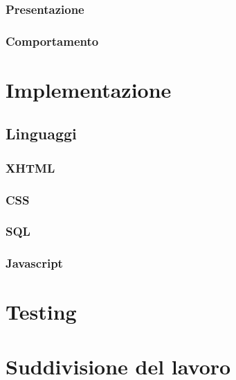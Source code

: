 \documentclass[12pt,a4paper,headings=optiontohead]{article}
\begin{document}
\subsubsection{Presentazione}
\subsubsection{Comportamento}

\section{Implementazione}
\subsection{Linguaggi}
\subsubsection{XHTML}
\subsubsection{CSS}
\subsubsection{SQL}
\subsubsection{Javascript}

\section{Testing}

\section{Suddivisione del lavoro}
\end{document}
